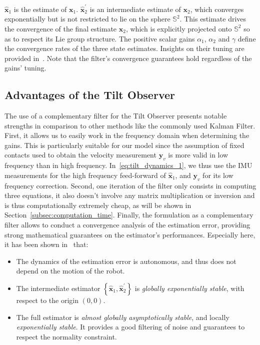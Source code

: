 \documentclass{IJCAS}
\begin{document}
$\hat{\boldsymbol{x}}_{1} $ is the estimate of $\boldsymbol{x}_{1} $. $\hat{\boldsymbol{x}}_{2}^{\prime}$ is an intermediate estimate of $\boldsymbol{x}_{2} $, which converges exponentially but is not restricted to lie on the sphere $\mathbb{S}^{2}$. This estimate drives the convergence of the final estimate $\hat{\boldsymbol{x}}_{2} $, which is explicitly projected onto $\mathbb{S}^{2}$ so as to respect its Lie group structure.
The positive scalar gains $\alpha_1$, $\alpha_2$ and $\gamma$ define the convergence rates of the three state estimates. Insights on their tuning are provided in~\cite{benallegue2023velocity}. Note that the filter's convergence guarantees hold regardless of the gains' tuning.

\subsection{Advantages of the Tilt Observer}
The use of a complementary filter for the Tilt Observer presents notable strengths in comparison to other methods like the commonly used Kalman Filter. First, it allows us to easily work in the frequency domain when determining the gains. This is particularly suitable for our model since the assumption of fixed contacts used to obtain the velocity measurement $\boldsymbol{y}_v$ is more valid in low frequency than in high frequency. In~\eqref{eq:tilt_dynamics_1}, we thus use the IMU measurements for the high frequency feed-forward of $\hat{\boldsymbol{x}}_{1}$, and $\boldsymbol{y}_v$ for its low frequency correction. Second, one iteration of the filter only consists in computing three equations, it also doesn't involve any matrix multiplication or inversion and is thus computationally extremely cheap, as will be shown in Section~\ref{subsec:computation_time}. Finally, the formulation as a complementary filter allows to conduct a convergence analysis of the estimation error, providing strong mathematical guarantees on the estimator's performances. Especially here, it has been shown in~\cite{benallegue2020LyapunovStableOrientationEstimatorHumanoids} that:
\begin{itemize}
    \item The dynamics of the estimation error is autonomous, and thus does not depend on the motion of the robot. 
    \item The intermediate estimator $\left\{\hat{\boldsymbol{x}}_{1}, \hat{\boldsymbol{x}}_{2}^{\prime} \right\}$ is \emph{globally exponentially stable}, with respect to the origin $\left(0,0\right)$.
    \item The full estimator is \emph{almost globally asymptotically stable}, and locally \emph{exponentially stable}. It provides a good filtering of noise and guarantees to respect the normality constraint.
\end{itemize}
\end{document}
